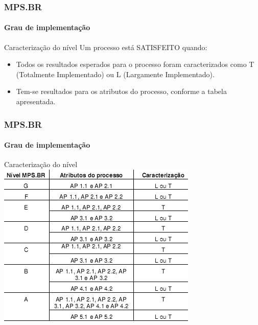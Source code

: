 \begin{frame}
	\frametitle{MPS.BR}
	\framesubtitle{Grau de implementação}
	
	\begin{block:fact}{Caracterização do nível}
		Um processo está SATISFEITO quando:
		\begin{itemize}
			\item Todos os resultados esperados para o processo foram caracterizados
			como T (Totalmente Implementado) ou L (Largamente Implementado).
			
			\item Tem-se resultados para os atributos do processo, conforme a tabela
			apresentada.
		\end{itemize}
	\end{block:fact}
\end{frame}

\begin{frame}
	\frametitle{MPS.BR}
	\framesubtitle{Grau de implementação}
	
	\begin{block:fact}{Caracterização do nível}
		\centering
		\includegraphics[width=.85\textwidth]{software-engineering/project-management/process/process-quality/mpsbr/mpsbr-ratings-uo}
	\end{block:fact}
\end{frame}


